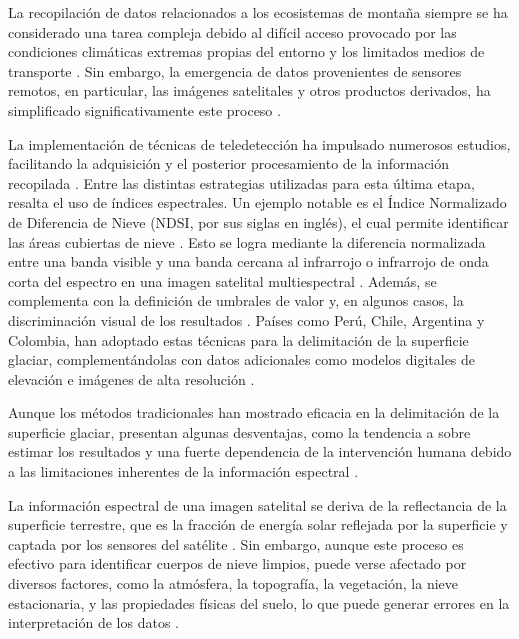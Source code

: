 La recopilación de datos relacionados a los ecosistemas de montaña siempre se ha considerado una tarea compleja debido al difícil acceso provocado por las condiciones climáticas extremas propias del entorno y los limitados medios de transporte \cite{fang2017discriminative, nijhawan2018hybrid}. Sin embargo, la emergencia de datos provenientes de sensores remotos, en particular, las imágenes satelitales y otros productos derivados, ha simplificado significativamente este proceso \cite{gavade2021systematic}.

La implementación de técnicas de teledetección ha impulsado numerosos estudios, facilitando la adquisición y el posterior procesamiento de la información recopilada \cite{zhang2019glacier}. Entre las distintas estrategias utilizadas para esta última etapa, resalta el uso de índices espectrales. Un ejemplo notable es el Índice Normalizado de Diferencia de Nieve (NDSI, por sus siglas en inglés), el cual permite identificar las áreas cubiertas de nieve \cite{hall1995mapping}. Esto se logra mediante la diferencia normalizada entre una banda visible y una banda cercana al infrarrojo o infrarrojo de onda corta del espectro en una imagen satelital multiespectral \cite{hall2010normalized}. Además, se complementa con la definición de umbrales de valor y, en algunos casos, la discriminación visual de los resultados \cite{sibandze2014comparison, singh2021quantifying}. Países como Perú, Chile, Argentina y Colombia, han adoptado estas técnicas para la delimitación de la superficie glaciar, complementándolas con datos adicionales como modelos digitales de elevación e imágenes de alta resolución \cite{inaigem2017manual, DGA2022, castro2014manual, ospina2022metodologia}.

Aunque los métodos tradicionales han mostrado eficacia en la delimitación de la superficie glaciar, presentan algunas desventajas, como la tendencia a sobre estimar los resultados y una fuerte dependencia de la intervención humana debido a las limitaciones inherentes de la información espectral \cite{singh2021quantifying}.

La información espectral de una imagen satelital se deriva de la reflectancia de la superficie terrestre, que es la fracción de energía solar reflejada por la superficie y captada por los sensores del satélite \cite{chuvieco2016fundamentals}. Sin embargo, aunque este proceso es efectivo para identificar cuerpos de nieve limpios, puede verse afectado por diversos factores, como la atmósfera, la topografía, la vegetación, la nieve estacionaria, y las propiedades físicas del suelo, lo que puede generar errores en la interpretación de los datos \cite{lu2020glacier, tian2022mapping}.

